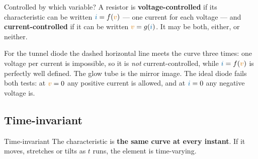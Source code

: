 \documentclass[11pt,a4paper]{article}
\newcommand{\Icol}[1]{\textcolor{ccur}{#1}}
\newcommand{\Vcol}[1]{\textcolor{cvolt}{#1}}
\newcommand{\uni}[1]{\,\mathrm{#1}}
\newcommand{\W}{\uni{W}}   \newcommand{\J}{\uni{J}}
\newcommand{\viaxes}[3]{%
  \draw[vax] (-#1,0) -- (#1,0) node[right=1pt, font=\scriptsize, text=cvolt] {$v$};
  \draw[vax] (0,-#2) -- (0,#2) node[above=1pt, font=\scriptsize, text=ccur] {$i$};
  \node[ttl] at (0,-#2-0.68) {#3};}
\begin{document}
\begin{definitionbox}{Controlled by which variable?}
A resistor is \textbf{voltage-controlled} if its characteristic can be written
$\Icol{i} = f(\Vcol{v})$ --- one current for each voltage --- and
\textbf{current-controlled} if it can be written $\Vcol{v} = g(\Icol{i})$. It may be
both, either, or neither.
\end{definitionbox}

\begin{center}
\end{center}
\vspace{2pt}

For the tunnel diode the dashed horizontal line meets the curve three times: one voltage
per current is impossible, so it is \emph{not} current-controlled, while
$\Icol{i} = f(\Vcol{v})$ is perfectly well defined. The glow tube is the mirror image. The
ideal diode fails both tests: at $\Vcol{v} = 0$ any positive current is allowed, and at
$\Icol{i} = 0$ any negative voltage is.

\subsection{Time-invariant}

\begin{definitionbox}{Time-invariant}
The characteristic is \textbf{the same curve at every instant}. If it moves, stretches or
tilts as $t$ runs, the element is time-varying.
\end{definitionbox}
\end{document}
